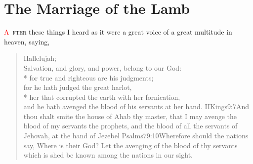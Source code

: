 
\chapter{The Marriage of the Lamb}
\lettrine[lines=3,slope=0.5em, lraise=0.3]{\textcolor{red}{A}}{\ fter} these things I heard as it were a great voice of a great multitude%
in heaven, saying,
\zz \begin{verse}
Hallelujah;\\
Salvation, and glory, and power, belong to our God:\\*\vin
{}for true and righteous are his judgments;\\
for he hath judged the great harlot,\\*\vin
her that corrupted the earth with her fornication,\\
and he hath avenged the blood of his servants at her hand.%
				{IIKings}{9:7}{And thou shalt smite the house of Ahab thy master, that I may avenge the blood of my servants the prophets, and the blood of all the servants of Jehovah, at the hand of Jezebel}%
				{Psalms}{79:10}{Wherefore should the nations say, Where is their God? Let the avenging of the blood of thy servants which is shed be known among the nations in our sight.} %
\end{verse}

